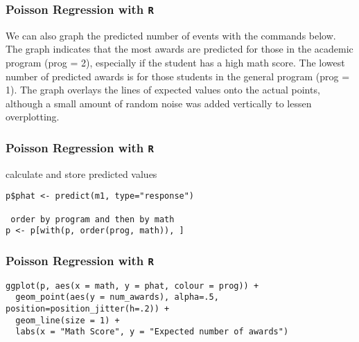 \documentclass[00-GLMregslides.tex]{subfiles}
\begin{document}
\begin{frame}[fragile]

\frametitle{Poisson Regression with \texttt{R}}
\Large


We can also graph the predicted number of events with the commands below. The graph indicates that the most awards are predicted for those in the academic program (prog = 2), especially if the student has a high math score. The lowest number of predicted awards is for those students in the general program (prog = 1). The graph overlays the lines of expected values onto the actual points, although a small amount of random noise was added vertically to lessen overplotting.

\end{frame}

\begin{frame}[fragile]

\frametitle{Poisson Regression with \texttt{R}}
\Large

 calculate and store predicted values

\begin{framed}
\begin{verbatim}
p$phat <- predict(m1, type="response")

 order by program and then by math
p <- p[with(p, order(prog, math)), ]
\end{verbatim}
\end{framed}
\end{frame}
\begin{frame}[fragile]

\frametitle{Poisson Regression with \texttt{R}}
\Large

\begin{framed}
\begin{verbatim}
ggplot(p, aes(x = math, y = phat, colour = prog)) +
  geom_point(aes(y = num_awards), alpha=.5, position=position_jitter(h=.2)) +
  geom_line(size = 1) +
  labs(x = "Math Score", y = "Expected number of awards")
\end{verbatim}
\end{framed}
\end{frame}
\end{document}
